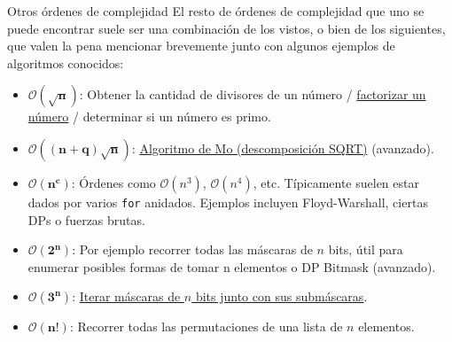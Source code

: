 \documentclass{beamer}
\begin{document}
    \begin{frame}{Otros órdenes de complejidad}
        El resto de órdenes de complejidad que uno se puede encontrar suele ser una combinación de los vistos, o bien de los siguientes, que valen la pena mencionar brevemente junto con algunos ejemplos de algoritmos conocidos: \pause \vspace{-13pt}

    \begin{itemize}
        \item $\bm{\mathcal{O}(\sqrt{n})}$: Obtener la cantidad de divisores de un número / \textcolor{blue}{\href{https://cp-algorithms.com/algebra/factorization.html\#trial-division}{factorizar un número}} / determinar si un número es primo.

        \item $\bm{\mathcal{O}((n+q) \sqrt{n})}$: \textcolor{blue}{\href{https://cp-algorithms.com/data_structures/sqrt_decomposition.html\#mos-algorithm}{Algoritmo de Mo (descomposición SQRT)}} (avanzado).

        \item $\bm{\mathcal{O}(n^c)}$: Órdenes como $\mathcal{O}(n^3)$, $\mathcal{O}(n^4)$, etc. Típicamente suelen estar dados por varios \texttt{for} anidados. Ejemplos incluyen Floyd-Warshall, ciertas DPs o fuerzas brutas.

        \item $\bm{\mathcal{O}(2^n)}$: Por ejemplo recorrer todas las máscaras de $n$ bits, útil para enumerar posibles formas de tomar n elementos o DP Bitmask (avanzado).

        \item $\bm{\mathcal{O}(3^n)}$: \textcolor{blue}{\href{https://cp-algorithms.com/algebra/all-submasks.html\#iterating-through-all-masks-with-their-submasks-complexity-o3n}{Iterar máscaras de $n$ bits junto con sus submáscaras}}.

        \item $\bm{\mathcal{O}(n!)}$: Recorrer todas las permutaciones de una lista de $n$ elementos.
        \end{itemize}
    \end{frame}
\end{document}
